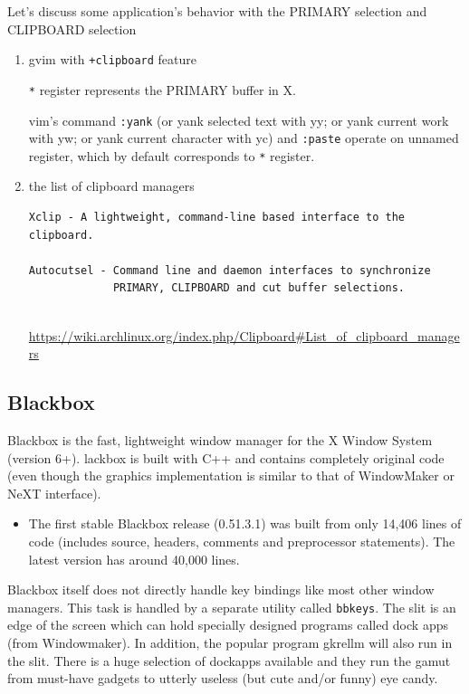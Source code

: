 Let's discuss some application's behavior with the PRIMARY selection and
CLIPBOARD selection
\begin{enumerate}
  \item gvim with \verb!+clipboard! feature
  
  \verb!*! register represents the PRIMARY buffer in X.
  
  vim's command \verb!:yank! (or yank selected text with yy; or yank current
  work with yw; or yank current character with yc) and \verb!:paste! 
 operate on unnamed register, which by default corresponds to \verb!*! register.
 
  
  \item the list of clipboard managers
  
\begin{verbatim}
Xclip - A lightweight, command-line based interface to the clipboard.

Autocutsel - Command line and daemon interfaces to synchronize 
             PRIMARY, CLIPBOARD and cut buffer selections.
 
\end{verbatim}
  \url{https://wiki.archlinux.org/index.php/Clipboard\#List_of_clipboard_managers}
\end{enumerate}



\subsection{Blackbox}

Blackbox is the fast, lightweight window manager for the X Window System
(version 6+).
lackbox is built with C++ and contains completely original code (even though the
graphics implementation is similar to that of WindowMaker or NeXT interface).
\begin{itemize}
  \item The first stable Blackbox release (0.51.3.1) was built from only 14,406
  lines of code (includes source, headers, comments and preprocessor
  statements). The latest version has around 40,000 lines. 
  
\end{itemize}

Blackbox itself does not directly handle key bindings like  most  other
window  managers.  This  task  is  handled by a separate utility called
\verb!bbkeys!.
The slit is an edge of the screen which  can  hold  specially  designed
        programs  called dock apps (from Windowmaker). In addition, the popular
        program gkrellm will also run in the slit.  There is a  huge  selection
        of  dockapps available and they run the gamut from must-have gadgets to
        utterly useless (but cute and/or funny) eye candy. 

